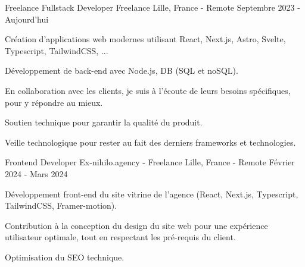 
\begin{cventries}  \cventry
    {Freelance Fullstack Developer} %
    {Freelance} %
    {Lille, France - Remote} %
    {Septembre 2023 - Aujourd'hui} %
    {
      \begin{cvitems} %
        \item {Création d'applications web modernes utilisant React, Next.js, Astro, Svelte, Typescript, TailwindCSS, ...}
        \item {Développement de back-end avec Node.js, DB (SQL et noSQL).}
        \item {En collaboration avec les clients, je suis à l'écoute de leurs besoins spécifiques, pour y répondre au mieux.}
        \item {Soutien technique pour garantir la qualité du produit.}
        \item {Veille technologique pour rester au fait des derniers frameworks et technologies.}
      \end{cvitems}
    }

  \cventry
    {Frontend Developer} %
    {Ex-nihilo.agency - Freelance} %
    {Lille, France - Remote} %
    {Février 2024 - Mars 2024} %
    {
      \begin{cvitems} %
        \item {Développement front-end du site vitrine de l'agence (React, Next.js, Typescript, TailwindCSS, Framer-motion).}
        \item {Contribution à la conception du design du site web pour une expérience utilisateur optimale, tout en respectant les pré-requis du client.}
        \item {Optimisation du SEO technique.}
      \end{cvitems}
    }


\end{cventries}
